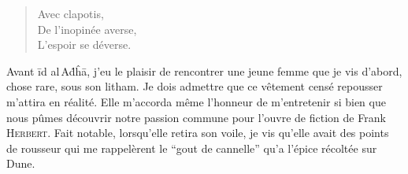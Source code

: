 %
%
%




\begin{verse}
Avec clapotis,\\
De l’inopinée averse,\\
L’espoir se déverse.
\end{verse}


\begin{prose}
Avant īd al\,Aḋĥā, j’eu le plaisir de rencontrer une jeune femme que je vis d’abord, chose rare, sous son litham. Je dois admettre que ce vêtement censé repousser m’attira en réalité. Elle m’accorda même l’honneur de m’entretenir si bien que nous pûmes découvrir notre passion commune pour l’ouvre de fiction de Frank \textsc{Herbert}. Fait notable, lorsqu’elle retira son voile, je vis qu’elle avait des points de rousseur qui me rappelèrent le \enquote{gout de cannelle} qu’a l’épice récoltée sur Dune.
\end{prose}


